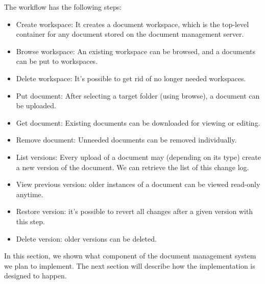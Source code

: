 The workflow has the following steps:

\begin{itemize}
\item Create workspace: It creates a document workspace, which is the top-level
container for any document stored on the document management server.
\item Browse workspace: An existing workspace can be browsed, and a documents
can be put to workspaces.
\item Delete workspace: It's possible to get rid of no longer needed workspaces.
\item Put document: After selecting a target folder (using browse), a document
can be uploaded.
\item Get document: Existing documents can be downloaded for viewing or editing.
\item Remove document: Unneeded documents can be removed individually.
\item List versions: Every upload of a document may (depending on its type)
create a new version of the document. We can retrieve the list of this change log.
\item View previous version: older instances of a document can be viewed
read-only anytime.
\item Restore version: it's possible to revert all changes after a given
version with this step.
\item Delete version: older versions can be deleted.
\end{itemize}

In this section, we shown what component of the document management system we
plan to implement. The next section will describe how the implementation is
designed to happen.

